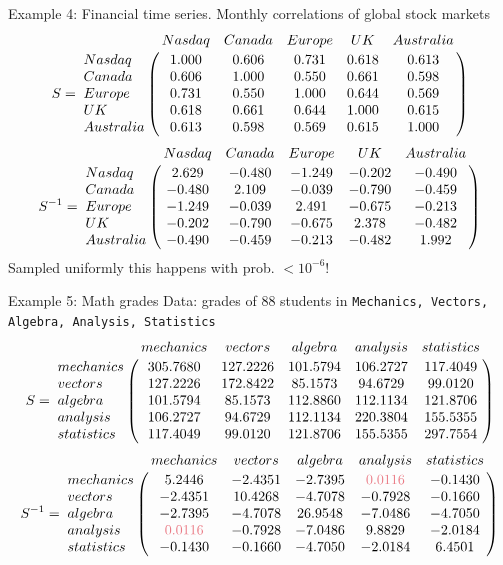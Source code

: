 \documentclass[dvipsnames,aspectratio=169]{beamer} %
\begin{document}
\begin{frame}{Example 4: Financial time series.}
	Monthly correlations of global stock markets
	{\footnotesize$$
S = \bordermatrix{~ & Nasdaq & Canada & Europe & UK &Australia \cr
              Nasdaq &    1.000 & 0.606 & 0.731 & 0.618 &0.613\cr
              Canada &    0.606 & 1.000 & 0.550 & 0.661 &0.598\cr
              Europe &    0.731 & 0.550 & 1.000 & 0.644 &0.569\cr
              UK &        0.618 & 0.661 & 0.644 & 1.000 &0.615\cr
              Australia & 0.613 & 0.598 & 0.569 & 0.615 &1.000\cr
              }
$$}
{\footnotesize$$
S^{-1} = \bordermatrix{~ & Nasdaq & Canada & Europe & UK &Australia \cr
              Nasdaq &    2.629 & -0.480 & -1.249 & -0.202 &-0.490\cr
              Canada &    -0.480 & 2.109 & -0.039 & -0.790 &-0.459\cr
              Europe &    -1.249 & -0.039 & 2.491 & -0.675 &-0.213\cr
              UK &        -0.202 & -0.790 & -0.675 & 2.378 &-0.482\cr
              Australia & -0.490 & -0.459 & -0.213 & -0.482 &1.992\cr
              }
$$}
Sampled uniformly this happens with prob. $<10^{-6}$!
\end{frame}

\begin{frame}{Example 5: Math grades}
Data:  grades of 88 students in
\texttt{Mechanics, Vectors, Algebra, Analysis, Statistics}
{\footnotesize$$
S = \bordermatrix{~ & mechanics & vectors & algebra & analysis & statistics \cr
              mechanics &    305.7680 & 127.2226 &101.5794 & 106.2727  & 117.4049\cr
              vectors &    127.2226 & 172.8422 & 85.1573  & 94.6729   & 99.0120\cr
              algebra &    101.5794  & 85.1573 & 112.8860 & 112.1134  & 121.8706\cr
              analysis &        106.2727&  94.6729& 112.1134& 220.3804&  155.5355\cr
              statistics & 117.4049&  99.0120 & 121.8706& 155.5355&  297.7554 \cr
              }
$$}
{\footnotesize$$
S^{-1} = \bordermatrix{~ & mechanics & vectors & algebra & analysis & statistics \cr
              mechanics &    5.2446& -2.4351& -2.7395&  \textcolor{Important}{0.0116}& -0.1430\cr
              vectors &    -2.4351 & 10.4268 &-4.7078 &-0.7928 & -0.1660\cr
              algebra &    -2.7395 &-4.7078 & 26.9548 &-7.0486 &-4.7050\cr
              analysis &        \textcolor{Important}{0.0116} &-0.7928 &-7.0486&  9.8829& -2.0184 \cr
              statistics & -0.1430 & -0.1660 & -4.7050 &-2.0184 & 6.4501\cr
              }
$$}
\end{frame}
\end{document}
